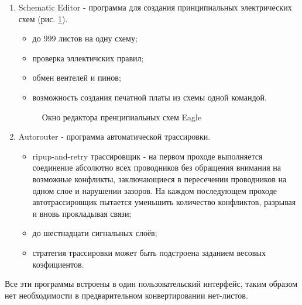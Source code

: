 \begin{par}
\begin{enumerate}
	
	\item{}Schematic Editor - программа для создания принципиальных электрических схем (рис. \ref{img:eagle_sch}).
		\begin{itemize}
			\item{}до 999 листов на одну схему;
			\item{}проверка эллектичских правил;
			\item{}обмен вентелей и пинов;
			\item{}возможность создания печатной платы из схемы одной командой.
		\end{itemize}
        \begin{figure}[h]
            \caption{Окно редактора пренципиальных схем Eagle}
            \label{img:eagle_sch}
        \end{figure}
	\item{}Autorouter - программа автоматической трассировки.
		\begin{itemize}
			\item{}ripup-and-retry трассировщик - на первом проходе выполняется соединение абсолютно всех проводников без обращения внимания на возможные конфликты, заключающиеся в пересечении проводников на одном слое и нарушении зазоров. На каждом последующем проходе автотрассировщик пытается уменьшить количество конфликтов, разрывая и вновь прокладывая связи;
			\item{}до шестнадцати сигнальных слоёв;
			\item{}стратегия трассировки может быть подстроена заданием весовых коэфициентов.
		\end{itemize}
\end{enumerate}

Все эти программы встроены в один пользовательский интерфейс, таким образом нет необходимости в
предварительном конвертировании нет-листов.
\end{par}
\newpage{}

